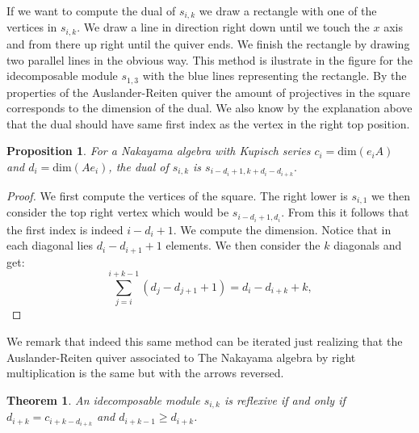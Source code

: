 \documentclass[12pt, a4paper]{article}
\numberwithin{equation}{section}
\theoremstyle{definition}
\theoremstyle{plain}
\newtheorem{proposition}[definition]{Proposition}
\newtheorem{theorem}[definition]{Theorem}
\theoremstyle{remark}
\begin{document}
If we want to compute the dual of $s_{i,k}$ we draw a rectangle
 with one of the vertices in $s_{i,k}.$ We draw a line in direction right 
 down until we touch the $x$ axis and from there up right until 
 the quiver ends. We finish the rectangle by drawing two parallel
  lines in the obvious way. This method is ilustrate in the figure for the idecomposable module $s_{1,3}$ with the blue lines representing the rectangle. 
  By the properties of the Auslander-Reiten quiver the amount of projectives in the square corresponds to the dimension of the dual. We also know by the explanation above that the dual should have same first index as the vertex in the right top position.
\begin{proposition}
    For a Nakayama algebra with Kupisch series $c_i=\text{dim}(e_iA)$ and $d_i=\text{dim}(Ae_i)$, the dual of $s_{i,k}$ is 
	$s_{i-d_i+1,k+d_i-d_{i+k}}.$
\end{proposition}
\begin{proof}
    We first compute the vertices of the square. The right lower is $s_{i,1}$ we then consider the top right vertex which would be $s_{i-d_{i}+1,d_{i}}.$ From this it follows that the first index is indeed $i-d_i+1.$ We compute the dimension. Notice that in each diagonal lies $d_{i}-d_{i+1}+1$ elements. We then consider the $k$ diagonals and get:
   \begin{equation}
\label{eq:reachable}
\sum_{j=i}^{i+k-1} (d_j - d_{j+1} + 1) = d_i - d_{i+k} + k,
\end{equation}
\end{proof}
We remark that indeed this same method can be iterated just realizing that the Auslander-Reiten quiver associated to The Nakayama algebra by right multiplication is the same but with the arrows reversed. 
\begin{theorem}\label{Theorem reflexive modules}
	An idecomposable module $s_{i,k}$ is reflexive if and only if $d_{i+k}=c_{i+k-d_{i+k}}$ and $d_{i+k-1}\geq d_{i+k}$.
\end{theorem}
\end{document}
